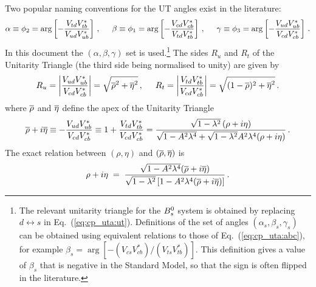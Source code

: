 Two popular naming conventions for the UT angles exist in the literature:
\begin{equation}
  \label{eq:cp_uta:abc}
  \alpha  \equiv  \phi_2  = 
  \arg\left[ - \frac{V_{td}V_{tb}^*}{V_{ud}V_{ub}^*} \right]\,,
  \hspace{0.5cm}
  \beta   \equiv   \phi_1 =  
  \arg\left[ - \frac{V_{cd}V_{cb}^*}{V_{td}V_{tb}^*} \right]\,,
  \hspace{0.5cm}
  \gamma  \equiv   \phi_3  =  
  \arg\left[ - \frac{V_{ud}V_{ub}^*}{V_{cd}V_{cb}^*} \right]\,.
\end{equation}
In this document the $\left( \alpha, \beta, \gamma \right)$ set is used.\footnote{
  The relevant unitarity triangle for the $B^0_s$ system is obtained 
  by replacing $d \leftrightarrow s$ in Eq.~(\ref{eq:cp_uta:ut}).
  Definitions of the set of angles $( \alpha_s, \beta_s, \gamma_s )$ 
  can be obtained using equivalent relations to those of Eq.~(\ref{eq:cp_uta:abc}),
  for example $\beta_s = \arg\left[ - (V_{cs}V_{cb}^*) / (V_{ts}V_{tb}^*) \right]$.
  This definition gives a value of $\beta_s$ that is negative in the Standard Model,
  so that the sign is often flipped in the literature.
}
The sides $R_u$ and $R_t$ of the Unitarity Triangle 
(the third side being normalised to unity) 
are given by
\begin{equation}
  \label{eq:ru_rt}
  R_u =
  \left|\frac{V_{ud}V_{ub}^*}{V_{cd}V_{cb}^*} \right|
  = \sqrt{\overline{\rho}^2+\overline{\eta}^2} \,,
  \hspace{0.5cm}
  R_t = 
  \left|\frac{V_{td}V_{tb}^*}{V_{cd}V_{cb}^*}\right| 
  = \sqrt{(1-\overline{\rho})^2+\overline{\eta}^2} \,.
\end{equation} 
where $\overline{\rho}$ and $\overline{\eta}$ define 
the apex of the Unitarity Triangle~\cite{Buras:1994ec} 
\begin{equation}
  \label{eq:rhoetabar}
  \overline{\rho} + i\overline{\eta}
  \equiv -\frac{V_{ud}V_{ub}^*}{V_{cd}V_{cb}^*}
  \equiv 1 + \frac{V_{td}V_{tb}^*}{V_{cd}V_{cb}^*}
  = \frac{\sqrt{1-\lambda^2}\,(\rho + i \eta)}{\sqrt{1-A^2\lambda^4}+\sqrt{1-\lambda^2}A^2\lambda^4(\rho+i\eta)} \, .
\end{equation}
The exact relation between $\left( \rho, \eta \right)$ and 
$\left( \overline{\rho}, \overline{\eta} \right)$ is
\begin{equation}
  \label{eq:rhoetabarinv}
  \rho + i\eta \;=\; 
  \frac{ 
    \sqrt{ 1-A^2\lambda^4 }(\overline{\rho}+i\overline{\eta}) 
  }{
    \sqrt{ 1-\lambda^2 } \left[ 1-A^2\lambda^4(\overline{\rho}+i\overline{\eta}) \right]
  } \, .
\end{equation}

